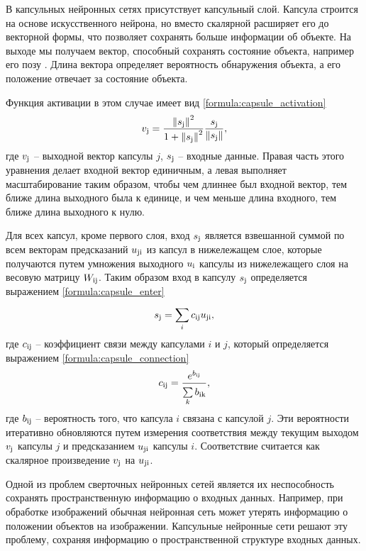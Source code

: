 В капсульных нейронных сетях присутствует капсульный слой. Капсула строится на основе искусственного нейрона, но вместо скалярной расширяет его до векторной формы, что позволяет сохранять больше информации об объекте. На выходе мы получаем вектор, способный сохранять состояние объекта, например его позу \cite{capsule2}. Длина вектора определяет вероятность обнаружения объекта, а его положение отвечает за состояние объекта.

Функция активации в этом случае имеет вид \ref{formula:capsule_activation}
\begin{equation}\label{formula:capsule_activation}
v_{\rm{j}} = \frac{\left\| s_{\rm{j}} \right\|^2}{1 + \left\| s_{\rm{j}} \right\|^2} \frac{s_{\rm{j}}}{\left\| s_{\rm{j}} \right\|},
\end{equation}
где $v_{\rm{j}}$ -- выходной вектор капсулы $j$, $s_{\rm{j}}$ -- входные данные. Правая часть этого уравнения делает входной вектор единичным, а левая выполняет масштабирование таким образом, чтобы чем длиннее был входной вектор, тем ближе длина выходного была к единице, и чем меньше длина входного, тем ближе длина выходного к нулю.

Для всех капсул, кроме первого слоя, вход $s_{\rm{j}}$ является взвешанной суммой по всем векторам предсказаний $u_{\rm{ji}}$ из капсул в нижележащем слое, которые получаются путем умножения выходного $u_{\rm{i}}$ капсулы из нижележащего слоя на весовую матрицу $W_{\rm{ij}}$. Таким образом вход в капсулу $s_{\rm{j}}$ определяется выражением \ref{formula:capsule_enter}
\begin{equation}\label{formula:capsule_enter}
s_{\rm{j}} = \sum\limits_{i}^{}c_{\rm{ij}}u_{\rm{ji}},
\end{equation}
где $c_{\rm{ij}}$ -- коэффициент связи между капсулами $i$ и $j$, который определяется выражением \ref{formula:capsule_connection}
\begin{equation}\label{formula:capsule_connection}
c_{\rm{ij}} = \frac{e^{b_{\rm{ij}}}}{\sum\limits_{k}^{}b_{\rm{ik}}},
\end{equation}
где $b_{\rm{ij}}$ -- вероятность того, что капсула $i$ связана с капсулой $j$. Эти вероятности итеративно обновляются путем измерения соответствия между текущим выходом $v_{\rm{j}}$ капсулы $j$ и предсказанием $u_{\rm{ji}}$ капсулы $i$. Соответствие считается как скалярное произведение $v_{\rm{j}}$ на $u_{\rm{ji}}$.

Одной из проблем сверточных нейронных сетей является их неспособность сохранять пространственную информацию о входных данных. Например, при обработке изображений обычная нейронная сеть может утерять информацию о положении объектов на изображении. Капсульные нейронные сети решают эту проблему, сохраняя информацию о пространственной структуре входных данных.

